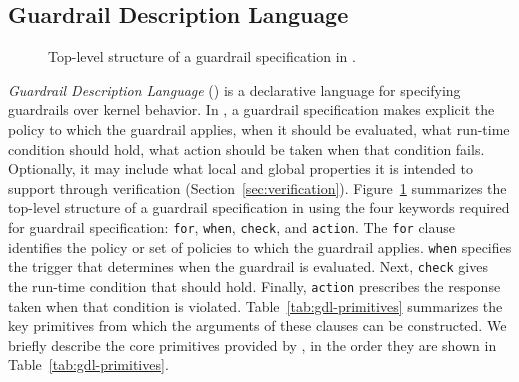 \subsection{Guardrail Description Language}\label{sec:gdl}

\begin{figure}[t]
\centering
\small
{}
\caption{Top-level structure of a guardrail specification in \lang.}
\label{fig:gdl-overview}
\end{figure}

\emph{Guardrail Description Language} (\lang) is a declarative language for specifying guardrails over kernel behavior. In \lang, a guardrail specification makes explicit the policy to which the guardrail applies, when it should be evaluated, what run-time condition should hold, what action should be taken when that condition fails. Optionally, it may include what local and global properties it is intended to support through verification (Section~\ref{sec:verification}). 
Figure~\ref{fig:gdl-overview} summarizes the top-level structure of a guardrail specification in \lang using the four keywords required for guardrail specification:
{\tt for}, {\tt when}, {\tt check}, and {\tt action}. 
The {\tt for} clause identifies the policy or set of policies to which the guardrail applies.
 {\tt when} specifies the trigger that determines when the guardrail is evaluated.
Next,  {\tt check}  gives the run-time condition that should hold.
Finally,  {\tt action}  prescribes the response taken when that condition is violated.
Table~\ref{tab:gdl-primitives} summarizes the key primitives from which the arguments of these clauses can be constructed. We briefly describe the core primitives provided by \lang,  in the order they are shown in Table~\ref{tab:gdl-primitives}.

